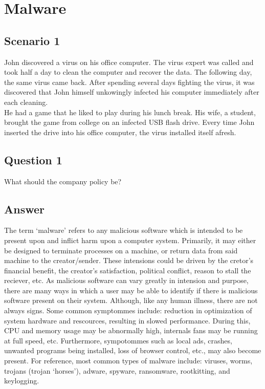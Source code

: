 \documentclass[11pt, english]{article}
\begin{document}
\newpage

\section{Malware}

	\subsection{Scenario 1}

	John discovered a virus on his office computer. The virus expert was called and took half a day to clean the computer and recover the data. The following day, the same virus came back. After spending several days fighting the virus, it was discovered that John himself unkowingly infected his computer immediately after each cleaning.\\

	He had a game that he liked to play during his lunch break. His wife, a student, brought the game from college on an infected USB flash drive. Every time John inserted the drive into his office computer, the virus installed itself afresh.

	\subsection{Question 1}

	What should the company policy be?

	\subsection{Answer}

	The term `malware' refers to any malicious software which is intended to be present upon and inflict harm upon a computer system. Primarily, it may either be designed to terminate processes on a machine, or return data from said machine to the creator/sender. These intensions could be driven by the cretor's financial benefit, the creator's satisfaction, political conflict, reason to stall the reciever, etc. As malicious software can vary greatly in intension and purpose, there are many ways in which a user may be able to identify if there is malicious software present on their system. Although, like any human illness, there are not always signs. Some common symptommes include: reduction in optimization of system hardware and rescources, resulting in slowed performance. During this, CPU and memory usage may be abnormally high, internals fans may be running at full speed, etc. Furthermore, sympotommes such as local ads, crashes, unwanted programs being installed, loss of browser control, etc., may also become present. For reference, most common types of malware include: viruses, worms, trojans (trojan `horses'), adware, spyware, ransomware, rootkitting, and keylogging. 
\end{document}
